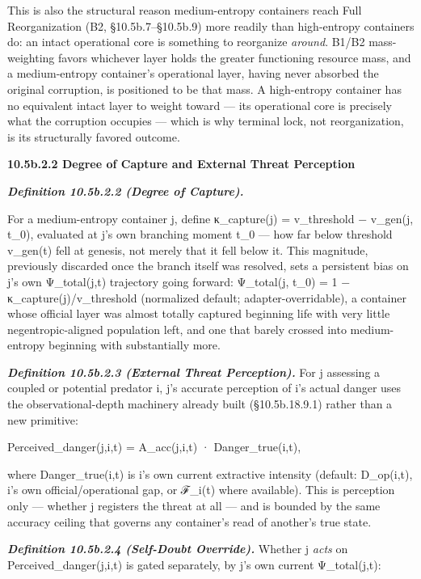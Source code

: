 \documentclass[
]{article}
\begin{document}
This is also the structural reason medium-entropy containers reach Full
Reorganization (B2, §10.5b.7--§10.5b.9) more readily than high-entropy
containers do: an intact operational core is something to reorganize
\emph{around}. B1/B2 mass-weighting favors whichever layer holds the
greater functioning resource mass, and a medium-entropy container's
operational layer, having never absorbed the original corruption, is
positioned to be that mass. A high-entropy container has no equivalent
intact layer to weight toward --- its operational core is precisely what
the corruption occupies --- which is why terminal lock, not
reorganization, is its structurally favored outcome.

\textbf{10.5b.2.2 Degree of Capture and External Threat Perception}

\emph{\textbf{Definition 10.5b.2.2 (Degree of Capture).}}

For a medium-entropy container j, define κ\_capture(j) = v\_threshold −
v\_gen(j, t\_0), evaluated at j's own branching moment t\_0 --- how far
below threshold v\_gen(t) fell at genesis, not merely that it fell below
it. This magnitude, previously discarded once the branch itself was
resolved, sets a persistent bias on j's own Ψ\_total(j,t) trajectory
going forward: Ψ\_total(j, t\_0) = 1 − κ\_capture(j)/v\_threshold
(normalized default; adapter-overridable), a container whose official
layer was almost totally captured beginning life with very little
negentropic-aligned population left, and one that barely crossed into
medium-entropy beginning with substantially more.

\emph{\textbf{Definition 10.5b.2.3 (External Threat Perception).}} For j
assessing a coupled or potential predator i, j's accurate perception of
i's actual danger uses the observational-depth machinery already built
(§10.5b.18.9.1) rather than a new primitive:

Perceived\_danger(j,i,t) = A\_acc(j,i,t) · Danger\_true(i,t),

where Danger\_true(i,t) is i's own current extractive intensity
(default: D\_op(i,t), i's own official/operational gap, or ℱ\_i(t) where
available). This is perception only --- whether j registers the threat
at all --- and is bounded by the same accuracy ceiling that governs any
container's read of another's true state.

\emph{\textbf{Definition 10.5b.2.4 (Self-Doubt Override).}} Whether j
\emph{acts} on Perceived\_danger(j,i,t) is gated separately, by j's own
current Ψ\_total(j,t):
\end{document}
